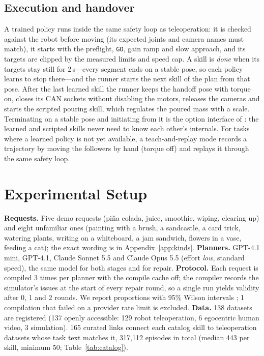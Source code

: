 \documentclass[10pt,twocolumn,letterpaper]{article}
\newcommand{\code}[1]{\texttt{\small #1}}
\begin{document}
\subsection{Execution and handover}\label{sec:handover}
A trained policy runs inside the same safety loop as teleoperation: it is checked against the robot before moving (its
expected joints and camera names must match), it starts with the preflight, \code{GO}, gain ramp and slow approach,
and its targets are clipped by the measured limits and speed cap. A skill is \emph{done} when its targets stay still
for 2\,s---every segment ends on a stable pose, so each policy learns to stop there---and the runner starts the next
skill of the plan from that pose. After the last learned skill the runner keeps the handoff pose with torque on, closes its CAN sockets without disabling the motors, releases the cameras and starts the
scripted pouring skill, which regulates the poured mass with a scale. Terminating on a stable pose and initiating
from it is the option interface of \citet{sutton1999options}: the learned and scripted skills never need to know each
other's internals. For tasks where a learned policy is not yet available, a teach-and-replay mode records a
trajectory by moving the followers by hand (torque off) and replays it through the same safety loop.

\section{Experimental Setup}
\textbf{Requests.} Five demo requests (piña colada, juice, smoothie, wiping, clearing up) and eight unfamiliar ones
(painting with a brush, a sandcastle, a card trick, watering plants, writing on a whiteboard, a jam sandwich, flowers
in a vase, feeding a cat); the exact wording is in Appendix~\ref{app:kinds}. \textbf{Planners.} GPT-4.1 mini, GPT-4.1,
Claude Sonnet 5.5 and Claude Opus 5.5 (effort \emph{low}, standard speed), the same model for both stages and for
repair. \textbf{Protocol.} Each request is compiled 3 times per planner with the compile cache off; the compiler records
the simulator's issues at the start of every repair round, so a single run yields validity after 0, 1 and 2 rounds. We
report proportions with 95\% Wilson intervals \citep{wilson1927}; 1 compilation that failed on a provider rate limit
is excluded. \textbf{Data.} 138 datasets are registered (137 openly accessible: 129 robot teleoperation, 6 egocentric
human video, 3 simulation). 165 curated links connect each catalog skill to teleoperation datasets whose task text
matches it, 317{,}112 episodes in total (median 443 per skill, minimum 50; Table~\ref{tab:catalog}).
\end{document}
